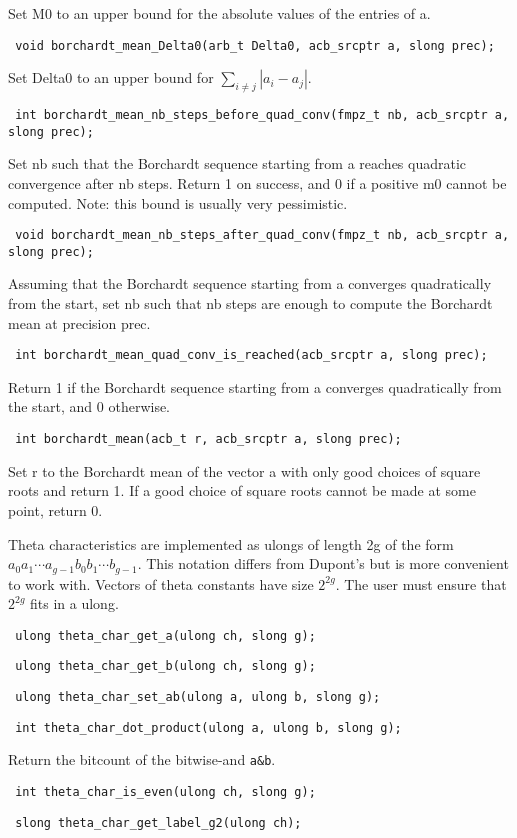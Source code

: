 \documentclass{article}
\newcommand{\code}[1]{\lstinline:#1:}
\newcommand{\fun}[1]{\vspace{2mm}\noindent \code{#1}}
\begin{document}
Set M0 to an upper bound for the absolute values of the entries of a.

\fun{
void borchardt_mean_Delta0(arb_t Delta0, acb_srcptr a, slong prec);
}

Set Delta0 to an upper bound for $\sum_{i\neq j} |a_i - a_j|$.

\fun{
int borchardt_mean_nb_steps_before_quad_conv(fmpz_t nb, acb_srcptr a, slong prec);
}

Set nb such that the Borchardt sequence starting from a reaches
quadratic convergence after nb steps. Return 1 on success, and 0 if a
positive m0 cannot be computed. Note: this bound is usually very
pessimistic.

\fun{
void borchardt_mean_nb_steps_after_quad_conv(fmpz_t nb, acb_srcptr a, slong prec);
}

Assuming that the Borchardt sequence starting from a converges
quadratically from the start, set nb such that nb steps are enough to
compute the Borchardt mean at precision prec.

\fun{
int borchardt_mean_quad_conv_is_reached(acb_srcptr a, slong prec);
}

Return 1 if the Borchardt sequence starting from a converges
quadratically from the start, and 0 otherwise.

\fun{
int borchardt_mean(acb_t r, acb_srcptr a, slong prec);
}

Set r to the Borchardt mean of the vector a with only good choices of
square roots and return 1. If a good choice of square roots cannot be
made at some point, return 0.


Theta characteristics are implemented as ulongs of length 2g of the
form $a_0 a_1 \cdots a_{g-1} b_0 b_1 \cdots b_{g-1}$. This notation
differs from Dupont's but is more convenient to work with. Vectors of
theta constants have size $2^{2g}$. The user must ensure that $2^{2g}$
fits in a ulong.

\fun{
ulong theta_char_get_a(ulong ch, slong g);
}  

\fun{
ulong theta_char_get_b(ulong ch, slong g);
}

\fun{
ulong theta_char_set_ab(ulong a, ulong b, slong g);
}

\fun{
int theta_char_dot_product(ulong a, ulong b, slong g);
}

Return the bitcount of the bitwise-and \code{a&b}.

\fun{
int theta_char_is_even(ulong ch, slong g);
}

\fun{
slong theta_char_get_label_g2(ulong ch);
}
\end{document}
